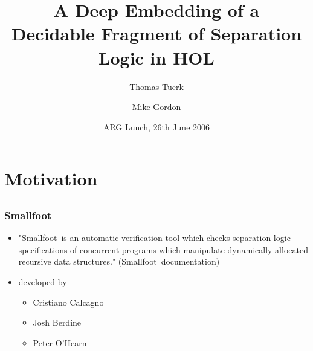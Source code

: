 
\title[Deep Embeeding of Separation Logic]{A Deep Embedding of a \\Decidable Fragment of Separation Logic in HOL}
\author[Tuerk, Gordon]{Thomas Tuerk \and Mike Gordon}
\date{ARG Lunch, 26th June 2006}

\newcommand{\smallfoot}{{\sf Smallfoot}}
\newcommand{\HOL}{{\sf HOL}}
\newcommand{\nil}{{\textsf{nil}}}
\newcommand{\pftrue}{{\textsf{true}}}
\newcommand{\pfequal}[2]{\ensuremath{#1 \doteq #2}}
\newcommand{\pfunequal}[2]{\ensuremath{#1 \not\doteq #2}}
\newcommand{\values}{{\emph{Values}}}
\newcommand{\valuesnil}{\ensuremath{\values_\nil}}
\newcommand{\vars}{{\emph{Vars}}}
\newcommand{\expr}{{\emph{Exp}}}
\newcommand{\fields}{{\emph{Fields}}}
\newcommand{\pf}{{\emph{pf}}}
\newcommand{\sfset}{{\emph{sf}}}
\newcommand{\modelspf}{{\models_{\textit{pf}}\ }}
\newcommand{\modelssf}{{\models_{\textit{sf}}\ }}
\newcommand{\modelsds}{{\models_{\textit{ds}}\ }}


\newcommand{\sfemp}{{\textsf{emp}}}
\newcommand{\sftree}{{\textsf{tree}}}
\newcommand{\sfpointsto}[2]{#1 \hookrightarrow [#2]}
\newcommand{\sfbintree}{{\textsf{bin-tree}}}
\newcommand{\sflist}{{\textsf{ls}}}

\newcommand{\varpf}[1]{\textit{pf}_{#1}}
\newcommand{\varsf}[1]{\textit{sf}_{#1}}
\newcommand{\varel}{\eta}
\newcommand{\varepl}{\pi}

\newcommand{\heapdistinct}{\textit{heap\_distinct}}
\newcommand{\entailment}[2]{#1\ \vdash\ #2}
\newcommand{\dom}{{\text{dom}}}
\newcommand{\tofin}{\xrightarrow{fin}}

\newcommand{\eqinferstyle}{
\mprset{fraction={={\raisebox{0pt}[5pt][5pt]{=}}=}}}




\frame{\titlepage}


\section{Motivation}
\subsection*{}

\begin{frame}
\frametitle{Smallfoot}
\begin{itemize}
\item "\smallfoot\ is an automatic verification tool which checks separation
logic specifications of concurrent programs which manipulate
dynamically-allocated recursive data structures." (\smallfoot\ documentation)
\item developed by
\begin{itemize}
\item Cristiano Calcagno
\item Josh Berdine
\item Peter O'Hearn
\end{itemize}
\end{itemize}
\end{frame}

